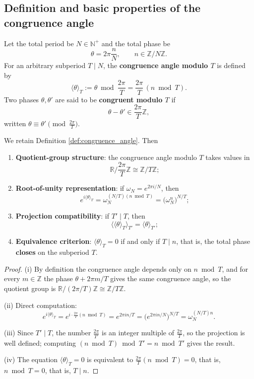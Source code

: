\subsection{Definition and basic properties of the congruence angle}

\begin{definition}\label{def:congruence_angle}
Let the total period be $N\in\mathbb{N}^+$ and the total phase be
\[
\theta=2\pi\frac{n}{N},\qquad n\in\mathbb{Z}/N\mathbb{Z}.
\]
For an arbitrary subperiod $T\mid N$, the \textbf{congruence angle modulo $T$} is defined by
\[
\langle\theta\rangle_T:=\theta\bmod\frac{2\pi}{T}
=\frac{2\pi}{T}\,(n\bmod T).
\]
Two phases $\theta,\theta'$ are said to be \textbf{congruent modulo $T$} if
\[
\theta-\theta'\in\frac{2\pi}{T}\mathbb{Z},
\]
written $\theta\equiv\theta'\pmod{\frac{2\pi}{T}}$.
\end{definition}

\begin{proposition}\label{prop:congruence_angle_properties}
We retain Definition \ref{def:congruence_angle}. Then
\begin{enumerate}[label=(\roman*)]
    \item \textbf{Quotient-group structure}: the congruence angle modulo $T$ takes values in
    \[
    \mathbb{R}\Big/\frac{2\pi}{T}\mathbb{Z}\cong\mathbb{Z}/T\mathbb{Z};
    \]
    \item \textbf{Root-of-unity representation}: if $\omega_N=e^{2\pi i/N}$, then
    \[
    e^{i\langle\theta\rangle_T}
    =\omega_N^{(N/T)(n\bmod T)}
    =\big(\omega_N^n\big)^{N/T};
    \]
    \item \textbf{Projection compatibility}: if $T'\mid T$, then
    \[
    \big\langle\langle\theta\rangle_T\big\rangle_{T'}
    =\langle\theta\rangle_{T'};
    \]
    \item \textbf{Equivalence criterion}: $\langle\theta\rangle_T=0$ if and only if $T\mid n$, that is, the total phase \textbf{closes} on the subperiod $T$.
\end{enumerate}
\end{proposition}

\begin{proof}
(i) By definition the congruence angle depends only on $n\bmod T$, and for every $m\in\mathbb{Z}$ the phase $\theta+2\pi m/T$ gives the same congruence angle, so the quotient group is $\mathbb{R}/(2\pi/T)\mathbb{Z}\cong\mathbb{Z}/T\mathbb{Z}$.

(ii) Direct computation:
\[
e^{i\langle\theta\rangle_T}
=e^{i\cdot\frac{2\pi}{T}(n\bmod T)}
=e^{2\pi i n/T}
=\big(e^{2\pi i n/N}\big)^{N/T}
=\omega_N^{(N/T)n}.
\]

(iii) Since $T'\mid T$, the number $\frac{2\pi}{T'}$ is an integer multiple of $\frac{2\pi}{T}$, so the projection is well defined; computing $(n\bmod T)\bmod T'=n\bmod T'$ gives the result.

(iv) The equation $\langle\theta\rangle_T=0$ is equivalent to $\frac{2\pi}{T}(n\bmod T)=0$, that is, $n\bmod T=0$, that is, $T\mid n$.
\end{proof}

